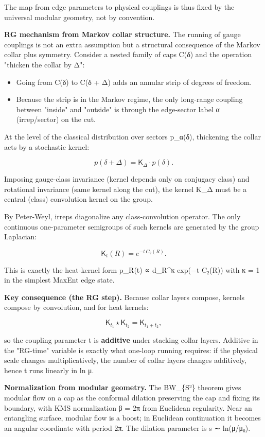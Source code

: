 The map from edge parameters to physical couplings is thus fixed by the universal modular geometry, not by convention.

\textbf{RG mechanism from Markov collar structure.} The running of gauge couplings is not an extra assumption but a structural consequence of the Markov collar plus symmetry. Consider a nested family of caps C(δ) and the operation "thicken the collar by Δ":

\begin{itemize}
\tightlist
\item
  Going from C(δ) to C(δ + Δ) adds an annular strip of degrees of freedom.
\item
  Because the strip is in the Markov regime, the only long-range coupling between "inside" and "outside" is through the edge-sector label α (irrep/sector) on the cut.
\end{itemize}

At the level of the classical distribution over sectors p\_α(δ), thickening the collar acts by a stochastic kernel:

\[
p(\delta + \Delta) = \mathsf{K}_\Delta \cdot p(\delta).
\]

Imposing gauge-class invariance (kernel depends only on conjugacy class) and rotational invariance (same kernel along the cut), the kernel K\_Δ must be a central (class) convolution kernel on the group.

By Peter-Weyl, irreps diagonalize any class-convolution operator. The only continuous one-parameter semigroups of such kernels are generated by the group Laplacian:

\[
\mathsf{K}_t(R) = e^{-t \, C_2(R)}.
\]

This is exactly the heat-kernel form p\_R(t) ∝ d\_R\^{}κ exp(−t C₂(R)) with κ = 1 in the simplest MaxEnt edge state.

\textbf{Key consequence (the RG step).} Because collar layers compose, kernels compose by convolution, and for heat kernels:

\[
\mathsf{K}_{t_1} \star \mathsf{K}_{t_2} = \mathsf{K}_{t_1 + t_2},
\]

so the coupling parameter t is \textbf{additive} under stacking collar layers. Additive in the "RG-time" variable is exactly what one-loop running requires: if the physical scale changes multiplicatively, the number of collar layers changes additively, hence t runs linearly in ln μ.

\textbf{Normalization from modular geometry.} The BW\_\{S²\} theorem gives modular flow on a cap as the conformal dilation preserving the cap and fixing its boundary, with KMS normalization β = 2π from Euclidean regularity. Near an entangling surface, modular flow is a boost; in Euclidean continuation it becomes an angular coordinate with period 2π. The dilation parameter is s ∼ ln(μ/μ₀).

